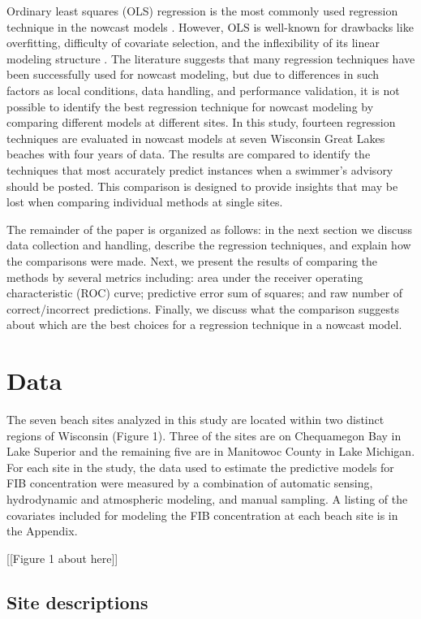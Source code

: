 \documentclass[authoryear,review, 12pt]{elsarticle}
\begin{document}
Ordinary least squares (OLS) regression is the most commonly used
regression technique in the nowcast models
\citep{deBrauwere-Koffi-Servais-2014}. However, OLS is well-known for
drawbacks like overfitting, difficulty of covariate selection, and the
inflexibility of its linear modeling structure \citep{Ge:2007ou}. The
literature suggests that many regression techniques have been
successfully used for nowcast modeling, but due to differences in such
factors as local conditions, data handling, and performance validation,
it is not possible to identify the best regression technique for nowcast
modeling by comparing different models at different sites. In this
study, fourteen regression techniques are evaluated in nowcast models at
seven Wisconsin Great Lakes beaches with four years of data. The results
are compared to identify the techniques that most accurately predict
instances when a swimmer's advisory should be posted. This comparison is
designed to provide insights that may be lost when comparing individual
methods at single sites.

The remainder of the paper is organized as follows: in the next section
we discuss data collection and handling, describe the regression
techniques, and explain how the comparisons were made. Next, we present
the results of comparing the methods by several metrics including: area
under the receiver operating characteristic (ROC) curve; predictive
error sum of squares; and raw number of correct/incorrect predictions.
Finally, we discuss what the comparison suggests about which are the
best choices for a regression technique in a nowcast model.

\section{Data}\label{data}

The seven beach sites analyzed in this study are located within two
distinct regions of Wisconsin (Figure 1). Three of the
sites are on Chequamegon Bay in Lake Superior and the remaining five are
in Manitowoc County in Lake Michigan. For each site in the study, the
data used to estimate the predictive models for FIB concentration were
measured by a combination of automatic sensing, hydrodynamic and
atmospheric modeling, and manual sampling. A listing of the covariates
included for modeling the FIB concentration at each beach site is in the
Appendix.

[[Figure 1 about here]]

\subsection{Site descriptions}\label{site-descriptions}
\end{document}
